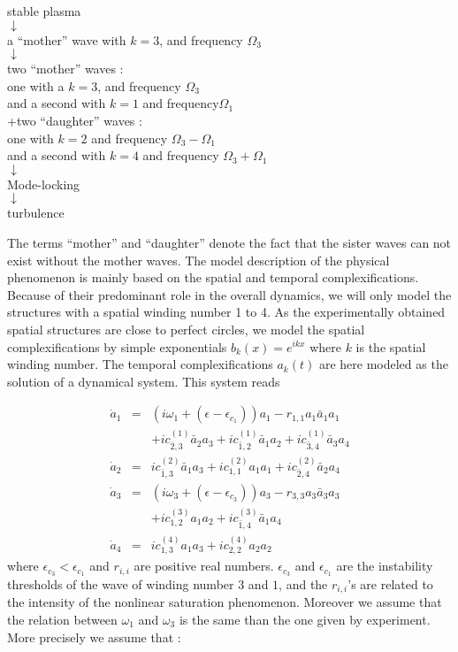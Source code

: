 \begin{center}
stable plasma\\
$\downarrow$\\
a ``mother'' wave with $k=3$, and frequency $\Omega_3$\\
$\downarrow$\\
two ``mother'' waves :\\
one with a $k=3$, and frequency $\Omega_3$\\
and a second with  $k=1$ and frequency$\Omega_1$\\
+two ``daughter'' waves :\\
one with $k=2$ and frequency $\Omega_3-\Omega_1$\\
and a second with $k=4$ and frequency $\Omega_3+\Omega_1$\\
$\downarrow$\\
Mode-locking\\
$\downarrow$\\
turbulence\\
\end{center}



The terms ``mother'' and ``daughter'' denote the fact that the sister
waves can not exist without the mother waves.
The model description of the physical phenomenon is 
mainly based on  the spatial and temporal complexifications.
Because of their predominant role in the overall dynamics, we
will only model the structures with a spatial winding number 1 to 4.
As  the experimentally obtained spatial structures are close to
perfect circles, we model the spatial complexifications
by simple exponentials $b_k(x)=e^{ikx}$ where $k$ is the
spatial winding number.
The temporal complexifications $a_k(t)$ are here modeled as the
solution of a dynamical system. This system reads

\begin{eqnarray}
\dot{a}_1&=&(i\omega_1+(\epsilon-\epsilon_{c_1}))a_1-r_{1,1}a_1\bar{a}_1a_1\nonumber\\
&&+ic^{(1)}_{\bar{2},3}\bar{a}_2{a}_3+ic^{(1)}_{\bar{1},2}\bar{a}_1a_2+ic^{(1)}_{\bar{3},4}\bar{a}_3a_4\label{eq1}\\
\dot{a}_2&=&ic^{(2)}_{\bar{1},3}\bar{a}_1{a}_3+ic^{(2)}_{1,1}a_1a_1+ic^{(2)}_{\bar{2},4}\bar{a}_2a_4\label{eq2}\\
\dot{a}_3&=&(i\omega_3+(\epsilon-\epsilon_{c_3}))a_3-r_{3,3}a_3\bar{a}_3a_3\nonumber\\
&&+ic^{(3)}_{1,2}a_1a_2+ic^{(3)}_{\bar{1},4}\bar{a}_1a_4\label{eq3}\\
\dot{a}_4&=&ic^{(4)}_{1,3}a_1a_3+ic^{(4)}_{2,2}a_2a_2\label{eq4}
\end{eqnarray}
where $\epsilon_{c_3}<\epsilon_{c_1}$ and $r_{i,i}$ are positive real 
numbers. $\epsilon_{c_3}$ and $\epsilon_{c_1}$ are the instability 
thresholds of the wave of winding number $3$ and $1$, and the
 $r_{i,i}$'s are related to the intensity of the nonlinear
saturation phenomenon.
Moreover we assume that the relation between $\omega_1$ and  $\omega_3$
is the same than the one given by experiment.
More precisely we assume that :


